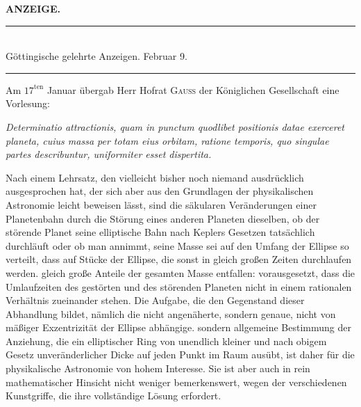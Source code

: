 \begingroup
\renewcommand{\arraystretch}{1.45}
\clearpage{}
\begin{center}
\textbf{ANZEIGE.}
\end{center}
\begin{center}
\rule{0.62\linewidth}{0.4pt}\\[6pt]
Göttingische gelehrte Anzeigen. Februar 9.\\[6pt]
\rule{0.62\linewidth}{0.4pt}
\end{center}

Am $17^{\mathrm{ten}}$ Januar übergab Herr Hofrat \textsc{Gauss} der Königlichen Gesellschaft eine Vorlesung:

\begin{center}
\textit{Determinatio attractionis, quam in punctum quodlibet positionis datae exerceret
planeta, cuius massa per totam eius orbitam, ratione temporis, quo singulae partes
describuntur, uniformiter esset dispertita.}
\end{center}

Nach einem Lehrsatz, den vielleicht bisher noch niemand ausdrücklich ausgesprochen hat, der sich aber aus den Grundlagen der physikalischen Astronomie leicht beweisen lässt, sind die säkularen Veränderungen einer Planetenbahn durch die Störung eines anderen Planeten dieselben, ob der störende Planet seine elliptische Bahn nach Keplers Gesetzen tatsächlich durchläuft oder ob man annimmt, seine Masse sei auf den Umfang der Ellipse so verteilt, dass auf Stücke der Ellipse, die sonst in gleich großen Zeiten durchlaufen werden. gleich große Anteile der gesamten Masse entfallen: vorausgesetzt, dass die Umlaufzeiten des gestörten und des störenden Planeten nicht in einem rationalen Verhältnis zueinander stehen. Die Aufgabe, die den Gegenstand dieser Abhandlung bildet, nämlich die nicht angenäherte, sondern genaue, nicht von mäßiger Exzentrizität der Ellipse abhängige. sondern allgemeine Bestimmung der Anziehung, die ein elliptischer Ring von unendlich kleiner und nach obigem
Gesetz unveränderlicher Dicke auf jeden Punkt im Raum ausübt, ist daher für die physikalische Astronomie von hohem Interesse. Sie ist aber auch in rein mathematischer Hinsicht nicht weniger bemerkenswert, wegen der verschiedenen Kunstgriffe, die ihre vollständige Lösung erfordert.

